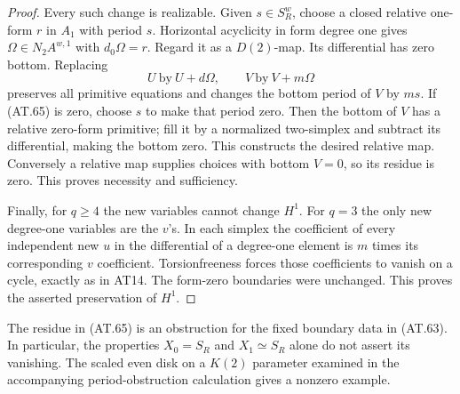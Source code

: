 \begin{proof}
Every such change is realizable.
Given $s\in S_R^w$, choose a closed relative one-form
$r$ in $A_1$ with period $s$.
Horizontal acyclicity in form degree one gives
$\Omega\in N_2A^{w,1}$ with $d_0\Omega=r$.
Regard it as a $D(2)$-map.
Its differential has zero bottom.
Replacing
\[
                     U\ \text{by}\ U+d\Omega,
                \qquad V\ \text{by}\ V+m\Omega
 \tag{AT.69}
\]
preserves all primitive equations and changes
the bottom period of $V$ by $ms$.
If \textup{(AT.65)} is zero, choose $s$ to make
that period zero.
Then the bottom of $V$ has a relative zero-form
primitive; fill it by a normalized two-simplex
and subtract its differential, making the bottom zero.
This constructs the desired relative map.
Conversely a relative map supplies choices with
bottom $V=0$, so its residue is zero.
This proves necessity and sufficiency.

Finally, for $q\geq4$ the new variables cannot
change $H^1$.
For $q=3$ the only new degree-one variables are
the $v$'s.
In each simplex the coefficient of every independent
new $u$ in the differential of a degree-one element
is $m$ times its corresponding $v$ coefficient.
Torsionfreeness forces those coefficients to vanish
on a cycle, exactly as in AT14.
The form-zero boundaries were unchanged.
This proves the asserted preservation of $H^1$.
\end{proof}

The residue in \textup{(AT.65)} is an obstruction
for the fixed boundary data in \textup{(AT.63)}.
In particular, the properties $X_0=S_R$ and
$X_1\simeq S_R$ alone do not assert its vanishing.
The scaled even disk on a $K(2)$ parameter examined
in the accompanying period-obstruction calculation
gives a nonzero example.

